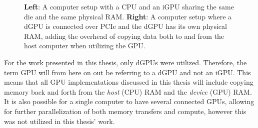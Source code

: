 \begin{figure}[H]\label{figure:igpu-and-dgpu-system}
\begin{center}
\hspace{4.5em}
\caption{\textbf{Left}: A computer setup with a CPU and an iGPU sharing the same die and the same physical RAM. \textbf{Right}: A computer setup where a dGPU is connected over PCIe and the dGPU has its own physical RAM, adding the overhead of copying data both to and from the host computer when utilizing the GPU.}
\end{center}
\end{figure}

For the work presented in this thesis, only dGPUs were utilized. 
Therefore, the term GPU will from here on out be referring to a dGPU and not an iGPU.
This means that all GPU implementations discussed in this thesis will include copying memory back and forth from the \textit{host} (CPU) RAM and the \textit{device} (GPU) RAM.
It is also possible for a single computer to have several connected GPUs, allowing for further parallelization of both memory transfers and compute, however this was not utilized in this thesis' work.
